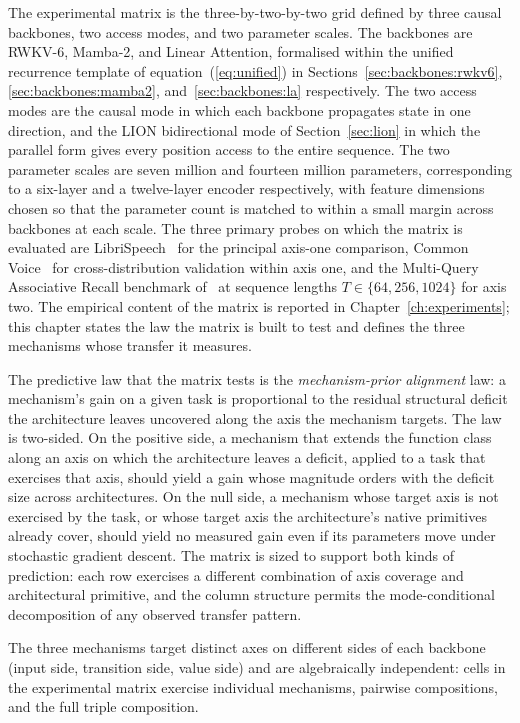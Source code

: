 The experimental matrix is the three-by-two-by-two grid defined by
three causal backbones, two access modes, and two parameter scales.
The backbones are RWKV-6, Mamba-2, and Linear Attention, formalised
within the unified recurrence template of equation~(\ref{eq:unified})
in Sections~\ref{sec:backbones:rwkv6}, \ref{sec:backbones:mamba2},
and~\ref{sec:backbones:la} respectively. The two access modes are the
causal mode in which each backbone propagates state in one direction,
and the LION bidirectional mode of Section~\ref{sec:lion} in which
the parallel form gives every position access to the entire sequence.
The two parameter scales are seven million and fourteen million
parameters, corresponding to a six-layer and a twelve-layer encoder
respectively, with feature dimensions chosen so that the parameter
count is matched to within a small margin across backbones at each
scale. The three primary probes on which the matrix is evaluated are
LibriSpeech~\cite{panayotov2015librispeech} for the principal axis-one
comparison, Common Voice~\cite{ardila2019commonvoice} for
cross-distribution validation within axis one, and the Multi-Query
Associative Recall benchmark of~\citet{arora2023zoology} at sequence
lengths $T \in \{64, 256, 1024\}$ for axis two. The empirical content
of the matrix is reported in Chapter~\ref{ch:experiments}; this
chapter states the law the matrix is built to test and defines the
three mechanisms whose transfer it measures.

The predictive law that the matrix tests is the
\textit{mechanism-prior alignment} law: a mechanism's gain on a given
task is proportional to the residual structural deficit the
architecture leaves uncovered along the axis the mechanism targets.
The law is two-sided. On the positive side, a mechanism that extends
the function class along an axis on which the architecture leaves a
deficit, applied to a task that exercises that axis, should yield a
gain whose magnitude orders with the deficit size across
architectures. On the null side, a mechanism whose target axis is
not exercised by the task, or whose target axis the architecture's
native primitives already cover, should yield no measured gain even
if its parameters move under stochastic gradient descent. The matrix
is sized to support both kinds of prediction: each row exercises a
different combination of axis coverage and architectural primitive,
and the column structure permits the mode-conditional decomposition
of any observed transfer pattern.

The three mechanisms target distinct axes on different sides of
each backbone (input side, transition side, value side) and are
algebraically independent: cells in the experimental matrix
exercise individual mechanisms, pairwise compositions, and the
full triple composition.

